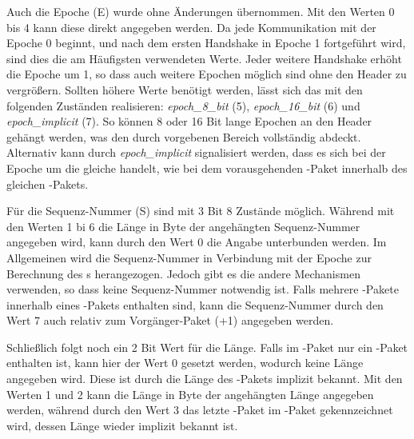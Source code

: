 Auch die Epoche (E) wurde ohne Änderungen übernommen. Mit den Werten 0 bis 4 kann diese direkt angegeben werden. Da jede Kommunikation mit der Epoche 0 beginnt, und
nach dem ersten Handshake in Epoche 1 fortgeführt wird, sind dies die am Häufigsten verwendeten Werte. Jeder weitere Handshake erhöht die Epoche um 1, so dass auch
weitere Epochen möglich sind ohne den Header zu vergrößern. Sollten höhere Werte benötigt werden, lässt sich das mit den folgenden Zuständen realisieren:
\textit{epoch\_8\_bit} (5), \textit{epoch\_16\_bit} (6) und \textit{epoch\_implicit} (7). So können 8 oder 16 Bit lange Epochen an den Header gehängt werden, was den
durch  vorgebenen Bereich vollständig abdeckt. Alternativ kann durch \textit{epoch\_implicit} signalisiert werden, dass es sich bei der Epoche um die gleiche
handelt, wie bei dem vorausgehenden -Paket innerhalb des gleichen -Pakets.

Für die Sequenz-Nummer (S) sind mit 3 Bit 8 Zustände möglich. Während mit den Werten 1 bi 6 die Länge in Byte der angehängten Sequenz-Nummer angegeben wird,
kann durch den Wert 0 die Angabe unterbunden werden. Im Allgemeinen wird die Sequenz-Nummer in Verbindung mit der Epoche zur Berechnung des s herangezogen.
Jedoch gibt es  die andere Mechanismen verwenden, so dass keine Sequenz-Nummer notwendig ist. Falls mehrere -Pakete innerhalb eines
-Pakets enthalten sind, kann die Sequenz-Nummer durch den Wert 7 auch relativ zum Vorgänger-Paket (+1) angegeben werden.

Schließlich folgt noch ein 2 Bit Wert für die Länge. Falls im -Paket nur ein -Paket enthalten ist, kann hier der Wert 0 gesetzt werden, wodurch
keine Länge angegeben wird. Diese ist durch die Länge des -Pakets implizit bekannt. Mit den Werten 1 und 2 kann die Länge in Byte der angehängten Länge
angegeben werden, während durch den Wert 3 das letzte -Paket im -Paket gekennzeichnet wird, dessen Länge wieder implizit bekannt ist.